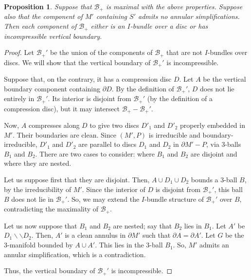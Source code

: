 \documentclass[oneside]{amsart}
\numberwithin{equation}{section}
\theoremstyle{plain}
\newtheorem{proposition}[equation]{Proposition}
\theoremstyle{definition}
\newcommand{\cut}{\backslash\backslash}
\newcommand{\calB}{\mathcal{B}}
\begin{document}
\begin{proposition}
\label{Prop:MaximalBundle}
Suppose that $\calB_+$ is maximal with the above properties. Suppose also that the component of
$M'$ containing $S'$ admits no annular simplifications. Then each component of $\calB_+$ 
either is an $I$-bundle over a disc or has incompressible vertical boundary.
\end{proposition}

\begin{proof}
Let $\calB_+'$ be the union of the components of $\calB_+$ that are not $I$-bundles over discs. We will
show that the vertical boundary of $\calB_+'$ is incompressible.

Suppose that, on the contrary, it has a compression disc $D$. Let $A$ be the vertical boundary component containing 
$\partial D$. By the definition of $\calB_+'$, $D$ does not lie entirely in $\calB_+'$. Its interior is disjoint from $\calB_+'$ (by the definition of a compression disc), but it may intersect $\calB_+ - \calB_+'$. 

Now, $A$ compresses along $D$ to give two discs $D'_1$ and $D'_2$ properly embedded in $M'$. Their boundaries are clean. Since $(M',P)$ is irreducible and
boundary-irreducible, $D'_1$ and $D'_2$ are parallel to discs $D_1$ and $D_2$ in $\partial M' - P$, via 3-balls $B_1$ and $B_2$. There are 
two cases to consider: where $B_1$ and $B_2$ are disjoint and where they are nested.

Let us suppose first that they are disjoint. Then, $A \cup D_1 \cup D_2$ bounds a 3-ball $B$, by the irreducibility of $M'$. Since
the interior of $D$ is disjoint from $\calB_+'$, this ball $B$ does not lie in $\calB_+'$. So, we may extend the $I$-bundle structure of  $\calB_+'$ over $B$, contradicting the maximality of $\calB_+$. 

Let us now suppose that $B_1$ and $B_2$ are nested; say that $B_2$ lies in $B_1$. Let $A'$ be $D_1 \cut D_2$. Then, $A'$ is a clean annulus in $\partial M'$ such that $\partial A = \partial A'$. Let $G$ be the 3-manifold bounded by $A \cup A'$. This lies in the 3-ball $B_1$. So, $M'$ admits an 
annular simplification, which is a contradiction.

Thus, the vertical boundary of $\calB_+'$ is incompressible. 
\end{proof}
\end{document}
